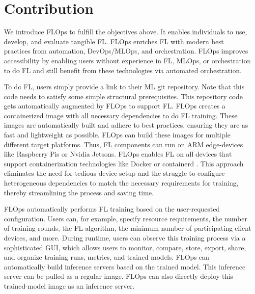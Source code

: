 \section{Contribution}

We introduce FLOps to fulfill the objectives above.
It enables individuals to use, develop, and evaluate tangible FL.
FLOps enriches FL with modern best practices from automation, DevOps/MLOps, and orchestration.
FLOps improves accessibility by enabling users without experience in
FL, MLOps, or orchestration to do FL and still benefit from these technologies via automated orchestration.

To do FL, users simply provide a link to their ML git repository.
Note that this code needs to satisfy some simple structural prerequisites.
This repository code gets automatically augmented by FLOps to support FL.
FLOps creates a containerized image with all necessary dependencies to do FL training.
These images are automatically built and adhere to best practices, ensuring they are
as fast and lightweight as possible.
FLOps can build these images for multiple different target platforms.
Thus, FL components can run on ARM edge-devices like Raspberry Pis or Nvidia Jetsons.
FLOps enables FL on all devices that support containerization technologies
like Docker \cite{docker_docs} or containerd \cite{containerd_docs}.
This approach eliminates the need for tedious device setup and the struggle to configure
heterogeneous dependencies to match the necessary requirements for training, thereby streamlining the
process and saving time.

FLOps automatically performs FL training based on the user-requested configuration.
Users can, for example, specify resource requirements, the number of training rounds, the FL algorithm,
the minimum number of participating client devices, and more.
During runtime, users can observe this training process via a sophisticated GUI,
which allows users to monitor, compare, store, export, share, and organize training runs,
metrics, and trained models.
FLOps can automatically build inference servers based on the trained model.
This inference server can be pulled as a regular image.
FLOps can also directly deploy this trained-model image as an inference server.

